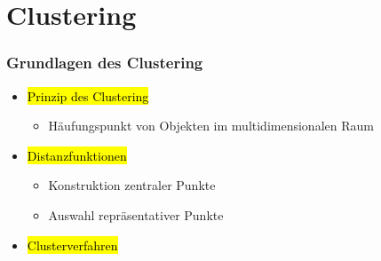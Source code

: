 \section{Clustering}




\begin{frame}%
\frametitle{Grundlagen des Clustering}

\begin{itemize}
\item \hl{Prinzip des Clustering}
\begin{itemize}
\item Häufungspunkt von Objekten im multidimensionalen Raum 
\end{itemize}
\item \hl{Distanzfunktionen}
\begin{itemize}
\item Konstruktion zentraler Punkte 
\item Auswahl repräsentativer Punkte 
\end{itemize}
\item\hl{Clusterverfahren}
\end{itemize}

\end{frame}


